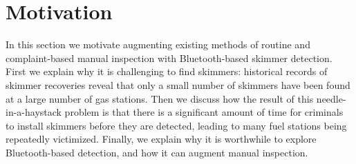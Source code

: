 
\section{Motivation}
\label{sec:motivation}

In this section we motivate augmenting existing methods of routine and
complaint-based manual inspection with Bluetooth-based skimmer detection.
%
First we explain why it is challenging to find skimmers:
%
historical records of skimmer recoveries reveal that only a small number of
skimmers have been found at a large number of gas stations.
%
Then we discuss how the result of this needle-in-a-haystack problem is that
there is a significant amount of time for criminals to install skimmers
before they are detected, leading to many fuel stations being repeatedly victimized.
%
Finally, we explain why it is worthwhile to explore Bluetooth-based detection,
and how it can augment manual inspection.



%
%
